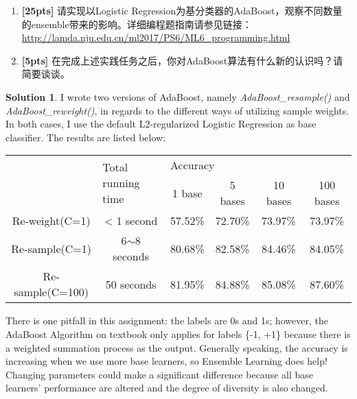 \documentclass[a4paper,UTF8]{article}
\numberwithin{equation}{section}
\theoremstyle{definition}
\newtheorem*{solution}{Solution}
\begin{document}
\begin{enumerate}[ {(}1{)}]
\item \textbf{[25pts]} 请实现以Logistic Regression为基分类器的AdaBoost，观察不同数量的ensemble带来的影响。详细编程题指南请参见链接：
\url{http://lamda.nju.edu.cn/ml2017/PS6/ML6_programming.html}
\item \textbf{[5pts]} 在完成上述实践任务之后，你对AdaBoost算法有什么新的认识吗？请简要谈谈。
\end{enumerate}
\begin{solution}
I wrote two versions of AdaBoost, namely \textit{AdaBoost\_resample()} and \textit{AdaBoost\_reweight()}, in regards to the different ways of utilizing sample weights. In both cases, I use the default L2-regularized Logistic Regression as base classifier. The results are listed below: 

\begin{table}[h!]
\centering
\begin{tabular}{l|l|cccc}
\multirow{2}{*}{}              & \multirow{2}{*}{Total running time}  & \multicolumn{4}{l}{\quad\quad\quad\quad\quad\quad Accuracy}             \\
                               &                                      & 1 base  & 5 bases & 10 bases & 100 bases \\ \hline
\multicolumn{1}{c|}{Re-weight(C=1)} & \multicolumn{1}{c|}{< 1 second}  & 57.52\% & 72.70\% & 73.97\%  & 73.97\% \\
\multicolumn{1}{c|}{Re-sample(C=1)} & \multicolumn{1}{c|}{6$\sim$8 seconds} & 80.68\% & 82.58\% & 84.46\%  & 84.05\%   \\
\multicolumn{1}{c|}{Re-sample(C=100)} & \multicolumn{1}{c|}{50 seconds} & 81.95\% & 84.88\% & 85.08\%  & 87.60\%
\end{tabular}
\end{table}
There is one pitfall in this assignment: the labels are 0s and 1s; however, the AdaBoost Algorithm on textbook only applies for labels \{-1, +1\} because there is a weighted summation process as the output. Generally speaking, the accuracy is increasing when we use more base learners, so Ensemble Learning does help! Changing parameters could make a significant difference because all base learners' performance are altered and the degree of diversity is also changed.

~\\
\end{solution}
\end{document}
